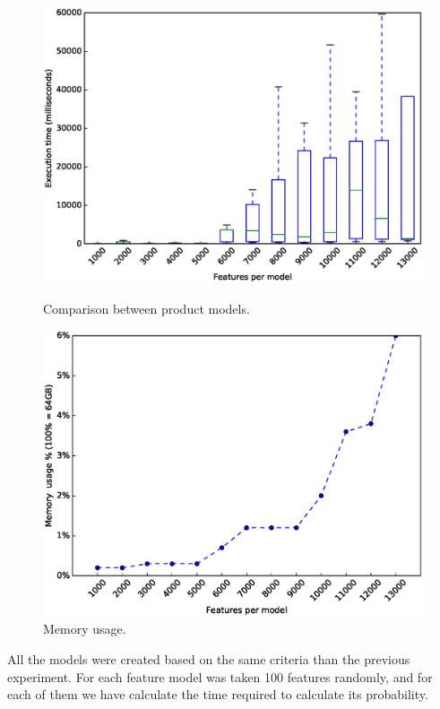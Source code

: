 \begin{figure}[h]
	\centering
	\begin{minipage}[b]{0.48\textwidth}
		\includegraphics[width=\textwidth]{boxplot.eps}
		\caption{Comparison between product models.}\label{fig:plot:probs:boxplot}
	\end{minipage}
	\hfill
	\begin{minipage}[b]{0.48\textwidth}
		\includegraphics[width=\textwidth]{boxplot_mem.eps}
		\caption{Memory usage.}\label{fig:plot:probs:boxplotmem}
	\end{minipage}
\end{figure}


All the models were created based on the
same criteria than the previous experiment.
For each feature model was taken 100 features
randomly, and for each of them we have calculate the 
time required to calculate its
probability.








